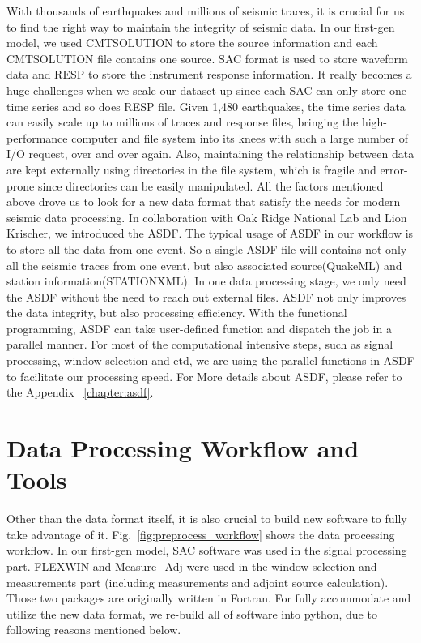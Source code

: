 With thousands of earthquakes and millions of seismic traces, it is crucial for
us to find the right way to maintain the integrity of seismic data.
In our first-gen model, we used CMTSOLUTION to store the source information and each
CMTSOLUTION file contains one source. SAC format is used to store waveform data and
RESP to store the instrument response information. It really becomes a huge challenges
when we scale our dataset up since each SAC can only store one time series and so
does RESP file. Given 1,480 earthquakes, the time series data can easily scale up to millions
of traces and response files, bringing the high-performance computer and file system
into its knees with such a large number of I/O request, over and over again.
Also, maintaining the relationship between data are kept externally using directories
in the file system,
which is fragile and error-prone since directories can be easily manipulated.
All the factors mentioned above drove us to
look for a new data format that satisfy the needs for modern seismic data processing.
In collaboration with Oak Ridge National Lab and Lion Krischer, we introduced the 
ASDF. The typical usage of ASDF in our workflow is to store all the data from one
event. So a single ASDF file will contains not only all the seismic traces from one
event, but also associated source(QuakeML) and station information(STATIONXML).
In one data processing stage, we only need the ASDF without the need to reach out
external files. ASDF not only improves the data integrity, but also processing efficiency.
With the functional programming, ASDF can take user-defined function and dispatch the job
in a parallel manner. For most of the computational intensive steps, such as signal
processing, window selection and etd, we are using the parallel functions in ASDF
to facilitate our processing speed.
For More details about ASDF, please refer to the Appendix ~\ref{chapter:asdf}.


\section{Data Processing Workflow and Tools}
\label{section:data_processing}

Other than the data format itself, it is also crucial to build new software
to fully take advantage of it.
Fig.~\ref{fig:preprocess_workflow} shows the data processing workflow.
In our first-gen model, SAC software was used in the signal processing part.
FLEXWIN and Measure\_Adj were used in the window selection and measurements part
(including measurements and adjoint source calculation).
Those two packages are originally written in Fortran. For fully accommodate
and utilize the new  data format, we re-build all of software into python,
due to following reasons mentioned below.

